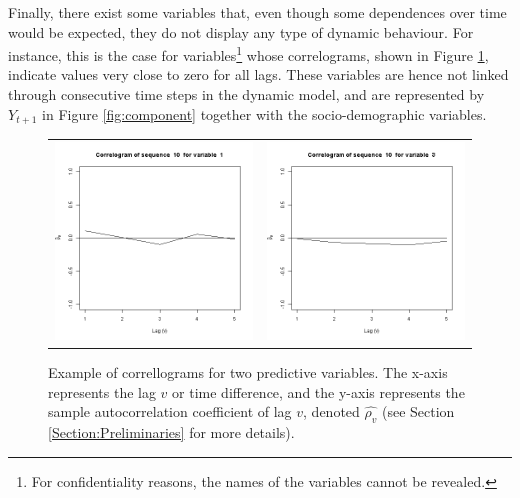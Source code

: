Finally, there exist some variables that, even though some dependences over time would be expected, they do not display any type of dynamic behaviour. For instance, this is the case for variables\footnote{For confidentiality reasons, the names of the variables cannot be revealed.} whose correlograms, shown in Figure \ref{fig:cajamarCorr}, indicate values very close to zero for all lags. These variables are hence not linked through consecutive time steps in the dynamic model, and are represented by $Y_{t+1}$ in Figure \ref{fig:component} together with the socio-demographic variables.


\begin{figure}[h]
  \centering
    \begin{tabular}{cc}
    \includegraphics[width=70mm]{figures/CajaMarcrl1}&
     \includegraphics[width=70mm]{figures/CajaMarcrl3}\\
  \end{tabular}
    \caption{\label{fig:cajamarCorr}Example of correllograms for two predictive variables.  The x-axis represents the lag $v$ or time difference, and the y-axis represents the sample autocorrelation coefficient of lag $v$, denoted $\hat{\rho_v}$ (see Section \ref{Section:Preliminaries} for more details).}
\end{figure}


